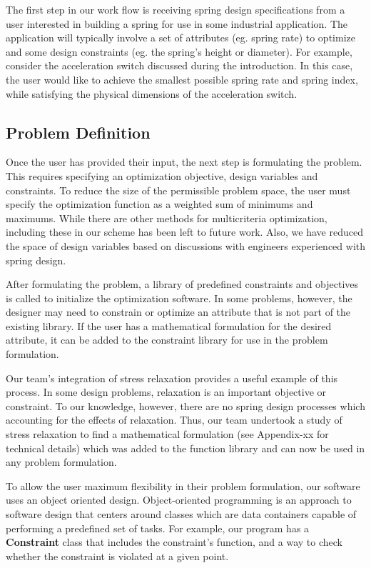 \documentclass[10pt]{article}
\begin{document}
The first step in our work flow is receiving spring design specifications from a user interested in building a spring for use in some industrial application.  The application will typically involve a set of attributes (eg. spring rate) to optimize and some design constraints (eg. the spring's height or diameter).  For example, consider the acceleration switch discussed during the introduction.  In this case, the user would like to achieve the smallest possible spring rate and spring index, while satisfying the physical dimensions of the acceleration switch.

\subsection{Problem Definition}
\label{sec:Problem_Definition}

Once the user has provided their input, the next step is formulating the problem.  This requires specifying an optimization objective, design variables and constraints.  To reduce the size of the permissible problem space, the user must specify the optimization function as a weighted sum of minimums and maximums.  While there are other methods for multicriteria optimization, including these in our scheme has been left to future work.  Also, we have reduced the space of design variables based on discussions with engineers experienced with spring design.

After formulating the problem, a library of predefined constraints and objectives is called to initialize the optimization software.  In some problems, however, the designer may need to constrain or optimize an attribute that is not part of the existing library.  If the user has a mathematical formulation for the desired attribute, it can be added to the constraint library for use in the problem formulation.

Our team's integration of stress relaxation provides a useful example of this process.  In some design problems, relaxation is an important objective or constraint.  To our knowledge, however, there are no spring design processes which accounting for the effects of relaxation.  Thus, our team undertook a study of stress relaxation to find a mathematical formulation (see Appendix-xx for technical details) which was added to the function library and can now be used in any problem formulation.

To allow the user maximum flexibility in their problem formulation, our software uses an object oriented design.  Object-oriented programming is an approach to software design that centers around classes which are data containers capable of performing a predefined set of tasks.  For example, our program has a \textbf{Constraint} class that includes the constraint's function, and a way to check whether the constraint is violated at a given point.
\end{document}
